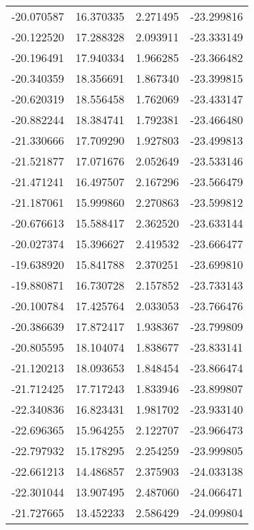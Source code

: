 \begin{tabular}{rrrr}
      -20.070587 &        16.370335 &    2.271495 & -23.299816 \\
      -20.122520 &        17.288328 &    2.093911 & -23.333149 \\
      -20.196491 &        17.940334 &    1.966285 & -23.366482 \\
      -20.340359 &        18.356691 &    1.867340 & -23.399815 \\
      -20.620319 &        18.556458 &    1.762069 & -23.433147 \\
      -20.882244 &        18.384741 &    1.792381 & -23.466480 \\
      -21.330666 &        17.709290 &    1.927803 & -23.499813 \\
      -21.521877 &        17.071676 &    2.052649 & -23.533146 \\
      -21.471241 &        16.497507 &    2.167296 & -23.566479 \\
      -21.187061 &        15.999860 &    2.270863 & -23.599812 \\
      -20.676613 &        15.588417 &    2.362520 & -23.633144 \\
      -20.027374 &        15.396627 &    2.419532 & -23.666477 \\
      -19.638920 &        15.841788 &    2.370251 & -23.699810 \\
      -19.880871 &        16.730728 &    2.157852 & -23.733143 \\
      -20.100784 &        17.425764 &    2.033053 & -23.766476 \\
      -20.386639 &        17.872417 &    1.938367 & -23.799809 \\
      -20.805595 &        18.104074 &    1.838677 & -23.833141 \\
      -21.120213 &        18.093653 &    1.848454 & -23.866474 \\
      -21.712425 &        17.717243 &    1.833946 & -23.899807 \\
      -22.340836 &        16.823431 &    1.981702 & -23.933140 \\
      -22.696365 &        15.964255 &    2.122707 & -23.966473 \\
      -22.797932 &        15.178295 &    2.254259 & -23.999805 \\
      -22.661213 &        14.486857 &    2.375903 & -24.033138 \\
      -22.301044 &        13.907495 &    2.487060 & -24.066471 \\
      -21.727665 &        13.452233 &    2.586429 & -24.099804 \\

\end{tabular}
